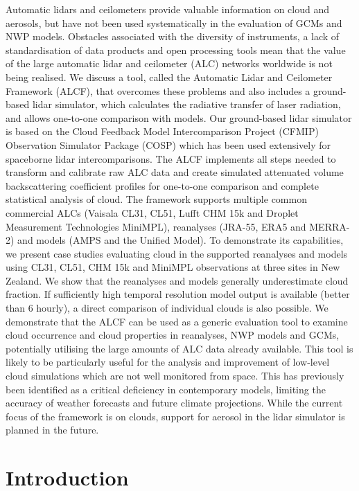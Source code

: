 Automatic lidars and ceilometers provide valuable information on cloud and aerosols, but have not been used systematically in the evaluation of GCMs and NWP models. Obstacles associated with the diversity of instruments, a lack of standardisation of data products and open processing tools mean that the value of the large automatic lidar and ceilometer (ALC) networks worldwide is not being realised. We discuss a tool, called the
Automatic Lidar and Ceilometer Framework (ALCF), that overcomes these problems and also includes a ground-based lidar simulator, which calculates the radiative transfer of laser radiation, and allows one-to-one comparison with models. Our ground-based lidar simulator is based on the Cloud Feedback Model Intercomparison
Project (CFMIP) Observation Simulator Package (COSP) which has been used extensively for spaceborne lidar intercomparisons. The ALCF
implements all steps needed to transform  and calibrate raw ALC data and create simulated
attenuated volume backscattering coefficient profiles for one-to-one comparison and complete statistical analysis of cloud. The framework supports multiple common
commercial ALCs (Vaisala CL31, CL51, Lufft CHM 15k and Droplet Measurement Technologies MiniMPL), reanalyses (JRA-55,
ERA5 and MERRA-2) and models (AMPS and the Unified Model). To demonstrate its
capabilities, we present case studies evaluating cloud in the
supported reanalyses and models using CL31, CL51, CHM 15k and MiniMPL
observations at three sites in New Zealand. We show that the reanalyses
and models generally underestimate cloud fraction.
If sufficiently high temporal resolution model output is available (better than 6 hourly), a direct comparison of
individual clouds is also possible. We demonstrate that the ALCF can be used as a generic
evaluation tool to examine cloud occurrence and cloud properties in reanalyses, NWP models and GCMs, potentially utilising the large amounts of ALC data already available. This tool  is likely to be  particularly useful for the analysis and improvement of low-level cloud simulations which are not well monitored from space. This has previously been identified as a critical deficiency in contemporary models, limiting the accuracy of weather forecasts and future climate projections.
While the current focus of the framework is on clouds, support for aerosol in the
lidar simulator is planned in the future.

\section{Introduction}

